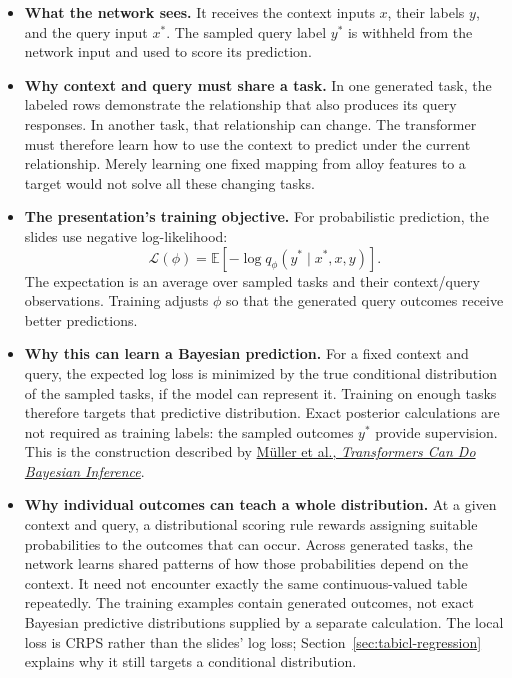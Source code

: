 \documentclass[11pt]{article}
\newenvironment{notes}
  {\begin{itemize}\setlength{\itemsep}{0.45em}\setlength{\parsep}{0pt}}
  {\end{itemize}}
\begin{document}
\begin{notes}
    \item \textbf{What the network sees.} It receives the context
    inputs \(x\), their labels \(y\), and the query input \(x^\ast\).
    The sampled query label \(y^\ast\) is withheld from the network
    input and used to score its prediction.

    \item \textbf{Why context and query must share a task.}
    In one generated task, the labeled rows demonstrate the
    relationship that also produces its query responses. In
    another task, that relationship can change. The transformer
    must therefore learn how to use the context to predict under
    the current relationship. Merely learning one fixed mapping
    from alloy features to a target would not solve all these
    changing tasks.

    \item \textbf{The presentation's training objective.}
    For probabilistic prediction, the slides use negative
    log-likelihood:
    \begin{equation}
        \mathcal{L}(\phi)
        =
        \mathbb{E}
        \left[-\log q_\phi(y^\ast\mid x^\ast,x,y)\right].
        \label{eq:pfn-nll}
    \end{equation}
    The expectation is an average over sampled tasks and their
    context/query observations. Training adjusts \(\phi\) so that
    the generated query outcomes receive better predictions.

    \item \textbf{Why this can learn a Bayesian prediction.}
    For a fixed context and query, the expected log loss is
    minimized by the true conditional distribution of the sampled
    tasks, if the model can represent it. Training on enough
    tasks therefore targets that predictive distribution.
    Exact posterior calculations are not required as training
    labels: the sampled outcomes \(y^\ast\) provide supervision.
    This is the construction described by
    \href{https://arxiv.org/abs/2112.10510}{M\"uller et al.,
    \textit{Transformers Can Do Bayesian Inference}}.

    \item \textbf{Why individual outcomes can teach a whole distribution.}
    At a given context and query, a distributional scoring rule
    rewards assigning suitable probabilities to the outcomes that
    can occur. Across generated tasks, the network learns shared
    patterns of how those probabilities depend on the context.
    It need not encounter exactly the same continuous-valued table
    repeatedly. The training examples contain generated outcomes,
    not exact Bayesian predictive distributions supplied by a
    separate calculation. The local loss is CRPS rather than the
    slides' log loss; Section~\ref{sec:tabicl-regression} explains
    why it still targets a conditional distribution.


\end{notes}
\end{document}
